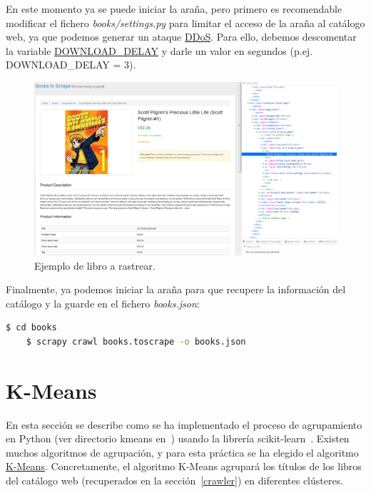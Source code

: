 \documentclass{uimppracticas}
\begin{document}
En este momento ya se puede iniciar la araña, pero primero es recomendable modificar el fichero \textit{books/settings.py} para limitar el acceso de la araña al catálogo web, ya que podemos generar un ataque \href{https://es.wikipedia.org/wiki/Ataque_de_denegaci%C3%B3n_de_servicio}{DDoS}. Para ello, debemos descomentar la variable \href{https://docs.scrapy.org/en/latest/topics/settings.html#download-delay}{DOWNLOAD\_DELAY} y darle un valor en segundos (p.ej. DOWNLOAD\_DELAY = 3). 	
	
\begin{figure}[h]
	\centering
	\includegraphics[scale=0.35]{images/book}
	\caption{Ejemplo de libro a rastrear.}
	\label{book}
\end{figure}

Finalmente, ya podemos iniciar la araña para que recupere la información del catálogo y la guarde en el fichero \textit{books.json}:

\begin{lstlisting}[language=bash]
	$ cd books
	$ scrapy crawl books.toscrape -o books.json
\end{lstlisting}

\section{K-Means}\label{kmeans} 

En esta sección se describe como se ha implementado el proceso de agrupamiento en Python (ver directorio kmeans en~\cite{GitHubRepo}) usando la librería scikit-learn~\cite{scikit-learn}. Existen muchos algoritmos de agrupación, y para esta práctica se ha elegido el algoritmo \href{https://scikit-learn.org/stable/modules/generated/sklearn.cluster.KMeans.html}{K-Means}. Concretamente, el algoritmo K-Means agrupará los títulos de los libros del catálogo web (recuperados en la sección~\ref{crawler}) en diferentes clústeres.
\end{document}
